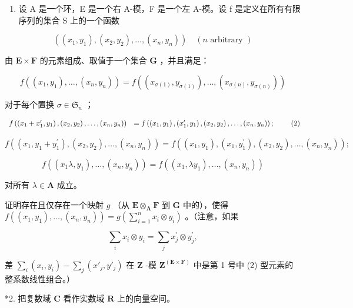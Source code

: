 \BourbakiExercisesSection

\begin{enumerate}
\def\labelenumi{\arabic{enumi}.}
\tightlist
\item
  设 A 是一个环，E 是一个右 A-模，F 是一个左 A-模。设 f 是定义在所有有限序列的集合 S 上的一个函数
\end{enumerate}

\[
((x _ {1}, y _ {1}), (x _ {2}, y _ {2}), \dots , (x _ {n}, y _ {n})) \quad (n \text {   arbitrary })
\]

由 \(\mathbf{E} \times \mathbf{F}\) 的元素组成、取值于一个集合 \(\mathbf{G}\) ，并且满足：

\[
f ((x _ {1}, y _ {1}), \dots , (x _ {n}, y _ {n})) = f ((x _ {\sigma (1)}, y _ {\sigma (1)}), \dots , (x _ {\sigma (n)}, y _ {\sigma (n)}))\tag{1}
\]

对于每个置换 \(\sigma \in \mathfrak{S}_n\) ；

\[
\begin{array}{r l} f \left(\left(x _ {1} + x _ {1} ^ {\prime}, y _ {1}\right), \left(x _ {2}, y _ {2}\right), \dots , \left(x _ {n}, y _ {n}\right)\right) & = f \left(\left(x _ {1}, y _ {1}\right), \left(x _ {1} ^ {\prime}, y _ {1}\right), \left(x _ {2}, y _ {2}\right), \dots , \left(x _ {n}, y _ {n}\right)\right); \end{array} \tag {2}
\]

\[
f ((x _ {1}, y _ {1} + y _ {1} ^ {\prime}), (x _ {2}, y _ {2}), \dots , (x _ {n}, y _ {n})) = f ((x _ {1}, y _ {1}), (x _ {1}, y _ {1} ^ {\prime}), (x _ {2}, y _ {2}), \dots , (x _ {n}, y _ {n}));\tag{3}
\]

\[
f ((x _ {1} \lambda , y _ {1}), \dots , (x _ {n}, y _ {n})) = f ((x _ {1}, \lambda y _ {1}), \dots , (x _ {n}, y _ {n}))\tag{4}
\]

对所有 \(\lambda \in \mathbf{A}\) 成立。

证明存在且仅存在一个映射 \(g\) （从 \(\mathbf{E} \otimes_{\mathbf{A}} \mathbf{F}\) 到 \(\mathbf{G}\) 中的），使得 \(f((x_1, y_1), \ldots, (x_n, y_n)) = g\left(\sum_{i=1}^{n} x_i \otimes y_i\right)\) 。（注意，如果

\[
\sum_ {i} x _ {i} \otimes y _ {i} = \sum_ {j} x _ {j} ^ {\prime} \otimes y _ {j} ^ {\prime},
\]

差 \(\sum_{i}(x_i, y_i) - \sum_j(x'_j, y'_j)\) 在 \(\mathbf{Z}\) -模 \(\mathbf{Z}^{(\mathbf{E} \times \mathbf{F})}\) 中是第 1 号中 (2) 型元素的整系数线性组合。）

*2. 把复数域 \(\mathbf{C}\) 看作实数域 \(\mathbf{R}\) 上的向量空间。

